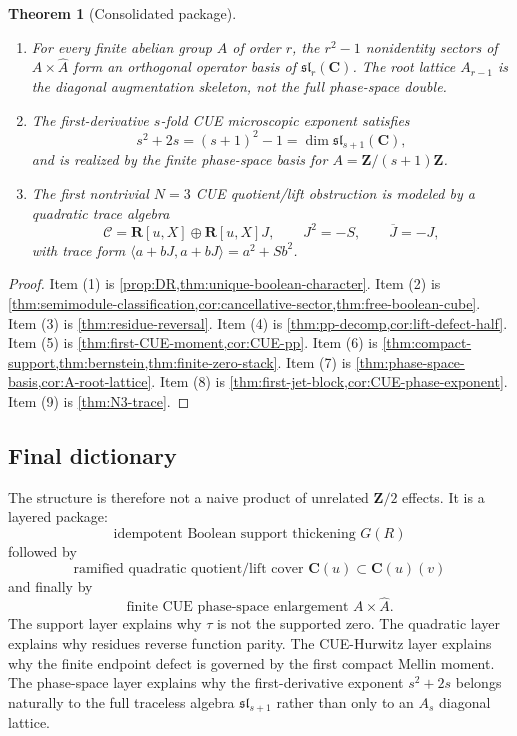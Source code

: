 \documentclass[11pt]{article}
\newcommand{\C}{\mathbf C}
\newcommand{\R}{\mathbf R}
\newcommand{\Z}{\mathbf Z}
\newcommand{\1}{\mathbf 1}
\newtheorem{theorem}{Theorem}[section]
\numberwithin{equation}{section}
\begin{document}
\begin{theorem}[Consolidated package]
\begin{enumerate}[label=\textup{(\arabic*)},leftmargin=2.4em]
\item For every finite abelian group $A$ of order $r$, the $r^2-1$ nonidentity sectors of $A\times\widehat A$ form an orthogonal operator basis of $\mathfrak{sl}_r(\C)$.  The root lattice $A_{r-1}$ is the diagonal augmentation skeleton, not the full phase-space double.
\item The first-derivative $s$-fold CUE microscopic exponent satisfies
\begin{equation}
  s^2+2s=(s+1)^2-1=\dim\mathfrak{sl}_{s+1}(\C),
\end{equation}
and is realized by the finite phase-space basis for $A=\Z/(s+1)\Z$.
\item The first nontrivial $N=3$ CUE quotient/lift obstruction is modeled by a quadratic trace algebra
\begin{equation}
  \mathcal C=\R[u,X]\oplus\R[u,X]J,
  \qquad
  J^2=-S,
  \qquad
  \overline J=-J,
\end{equation}
with trace form $\langle a+bJ,a+bJ\rangle=a^2+Sb^2$.
\end{enumerate}
\end{theorem}

\begin{proof}
Item (1) is \cref{prop:DR,thm:unique-boolean-character}.  Item (2) is \cref{thm:semimodule-classification,cor:cancellative-sector,thm:free-boolean-cube}.  Item (3) is \cref{thm:residue-reversal}.  Item (4) is \cref{thm:pp-decomp,cor:lift-defect-half}.  Item (5) is \cref{thm:first-CUE-moment,cor:CUE-pp}.  Item (6) is \cref{thm:compact-support,thm:bernstein,thm:finite-zero-stack}.  Item (7) is \cref{thm:phase-space-basis,cor:A-root-lattice}.  Item (8) is \cref{thm:first-jet-block,cor:CUE-phase-exponent}.  Item (9) is \cref{thm:N3-trace}.
\end{proof}

\subsection*{Final dictionary}
The structure is therefore not a naive product of unrelated $\Z/2$ effects.  It is a layered package:
\begin{equation}
  \boxed{\text{idempotent Boolean support thickening }G(R)}
\end{equation}
followed by
\begin{equation}
  \boxed{\text{ramified quadratic quotient/lift cover }\C(u)\subset\C(u)(v)}
\end{equation}
and finally by
\begin{equation}
  \boxed{\text{finite CUE phase-space enlargement }A\times\widehat A.}
\end{equation}
The support layer explains why $\tau$ is not the supported zero.  The quadratic layer explains why residues reverse function parity.  The CUE-Hurwitz layer explains why the finite endpoint defect is governed by the first compact Mellin moment.  The phase-space layer explains why the first-derivative exponent $s^2+2s$ belongs naturally to the full traceless algebra $\mathfrak{sl}_{s+1}$ rather than only to an $A_s$ diagonal lattice.
\end{document}
